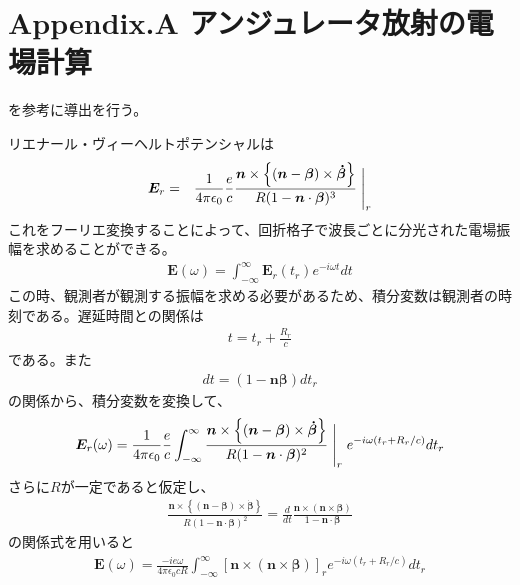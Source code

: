 \documentclass[a4paper,11pt,uplatex]{jsbook}
\begin{document}
\chapter*{Appendix.A アンジュレータ放射の電場計算}
\cite{wiedemann2015}を参考に導出を行う。

リエナール・ヴィーヘルトポテンシャルは
\begin{eqnarray}
  \bm{E}_r &=& \frac{1}{4\pi \epsilon_0} \frac{e}{c}  \frac{\bm{n}\times \left\{ (\bm{n}-\bm{\beta})\times \bm{\dot{\beta}}\right\}}
  {R(1-\bm{n}\cdot\bm{\beta})^3} \Biggm\vert_r
\end{eqnarray}
これをフーリエ変換することによって、回折格子で波長ごとに分光された電場振幅を求めることができる。
\begin{align}
  \bm{E}(\omega) = \int_{-\infty}^{\infty} \bm{E}_r(t_r) e^{-i\omega t} dt
\end{align}
この時、観測者が観測する振幅を求める必要があるため、積分変数は観測者の時刻である。遅延時間との関係は
\begin{align}
  t = t_r + \frac{R_r}{c}
\end{align}
である。また
\begin{align}
  dt =  (1 - \bm{n}\bm{\beta})dt_r
\end{align}
の関係から、積分変数を変換して、
\begin{align}
  \bm{E}_r(\omega) &= \frac{1}{4\pi\epsilon_0}\frac{e}{c} \int_{-\infty}^{\infty}
   \frac{\bm{n}\times \left\{ (\bm{n}-\bm{\beta})\times \bm{\dot{\beta}}\right\}}{R(1-\bm{n}\cdot\bm{\beta})^2} \Biggm\vert_r
   e^{-i\omega (t_r + R_r /c)} dt_r \\
\end{align}
さらに$R$が一定であると仮定し、
\begin{align}
  \frac{\bm{n}\times \left\{ (\bm{n}-\bm{\beta})\times \bm{\dot{\beta}}\right\}}{R(1-\bm{n}\cdot\bm{\beta})^2} 
   = \frac{d}{dt} \frac{\bm{n}\times \left( \bm{n} \times \bm{\beta}\right) }{1-\bm{n}\cdot\bm{\beta}}
\end{align}
の関係式を用いると
\begin{align}
  \bm{E}(\omega) = \frac{-ie\omega}{4\pi\epsilon_0 cR} 
  \int_{-\infty}^{\infty} \left[ \bm{n}\times \left( \bm{n} \times \bm{\beta}\right) \right]_r e^{-i\omega (t_r + R_r/c)} dt_r
\end{align}
\end{document}
